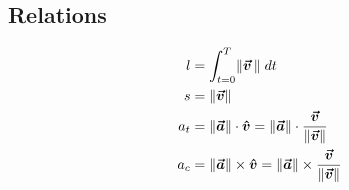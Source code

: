 \subsection{Relations}

\begin{align}
l& = \int_{t=0}^{T} \norm{\boldsymbol{\vec{v}} \, } \; dt\\
%
s& = \norm{\boldsymbol{\vec{v}}}\\
%
a_t& = \norm{\boldsymbol{\vec{a}}} \cdot \boldsymbol{\hat{v}} = \norm{\boldsymbol{\vec{a}}} \cdot \frac{\boldsymbol{\vec{v}}}{\norm{\boldsymbol{\vec{v}}}}\\
%
a_c& = \norm{\boldsymbol{\vec{a}}} \times \boldsymbol{\hat{v}} = \norm{\boldsymbol{\vec{a}}} \times \frac{\boldsymbol{\vec{v}}}{\norm{\boldsymbol{\vec{v}}}}
\end{align}